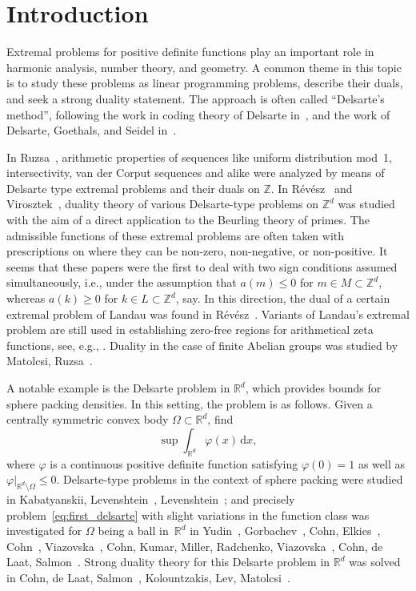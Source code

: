\documentclass[[a4paper,english,12pt]{amsart}
\theoremstyle{plain}
\theoremstyle{remark}
\newcommand{\ff}{\varphi}
\begin{document}
\section{Introduction} \label{section:introduction}

Extremal problems for positive definite functions play an important role in harmonic analysis, number theory, and geometry.  A common theme in this topic is to study these problems as linear programming problems, describe their duals, and seek a strong duality statement. The approach is often called ``Delsarte's method'', following the work in coding theory of Delsarte in~\cite{delsarte1}, and the work of Delsarte, Goethals, and Seidel in~\cite{delsarte2}.

In Ruzsa~\cite{Ruzsa1981, Ruzsa1982}, arithmetic properties of sequences like uniform distribution mod~1, intersectivity, van der Corput sequences and alike were analyzed by means of Delsarte type  extremal problems and their duals on $\mathbb{Z}$. In R\'ev\'esz~\cite{revesz, Revesz-Beurling, R-Landau} and Virosztek~\cite{virosztek}, duality theory of various Delsarte-type problems on $\mathbb{Z}^d$ was studied with the aim of a direct application to the Beurling theory of primes. The admissible functions of these extremal problems are often taken with prescriptions on where they can be non-zero, non-negative, or non-positive. It seems that these papers were the first to deal with two sign conditions assumed simultaneously, i.e., under the assumption that $a(m)\le 0$ for $m \in  M \subset \mathbb{Z}^d$, whereas $a(k)\ge 0$ for $k \in L \subset \mathbb{Z}^d$, say.  In this direction, the dual of a certain extremal problem of Landau was found in R\'ev\'esz~\cite{R-Landau}. Variants of Landau's extremal problem are still used in establishing zero-free regions for arithmetical zeta functions, see, e.g., \cite{frederik}. Duality in the case of finite Abelian groups was studied by Matolcsi, Ruzsa~\cite{MatolcsiRuzsa}. 

A notable example is the Delsarte problem in $\mathbb{R}^d$, which provides bounds for sphere packing densities. In this setting, the problem is as follows. Given a centrally symmetric convex body $\Omega \subset \mathbb{R}^d$, find 
\begin{equation} \label{eq:first_delsarte}
    \sup\int_{\mathbb{R}^d} \ff(x) \,\mbox{d}x,
\end{equation}
where $\ff$ is a continuous positive definite function satisfying $\ff(0)=1$ as well as ${\ff|_{\mathbb{R}^d\setminus\Omega} \le 0}$. Delsarte-type problems in the context of sphere packing were studied in Kabatyanskii, Levenshtein~\cite{KabLev}, Levenshtein~\cite{Levenshtein}; and precisely problem~\eqref{eq:first_delsarte} with slight variations in the function class was investigated for $\Omega$ being a ball in~$\mathbb{R}^d$ in Yudin~\cite{Yudin}, Gorbachev~\cite{GorbachevTula, gorbachev}, Cohn, Elkies~\cite{cohn-elkies}, Cohn~\cite{Cohn},   Viazov\-ska~\cite{viazovska}, Cohn, Kumar, Miller, Radchenko, Viazovska~\cite{CKMRV}, Cohn, de Laat, Salmon~\cite{Cohn-Laat-Salmon}. Strong duality theory for this Delsarte problem in $\mathbb{R}^d$ was solved in Cohn, de Laat, Salmon~\cite{Cohn-Laat-Salmon}, Kolountzakis, Lev, Matolcsi~\cite{KLM}.
\end{document}

